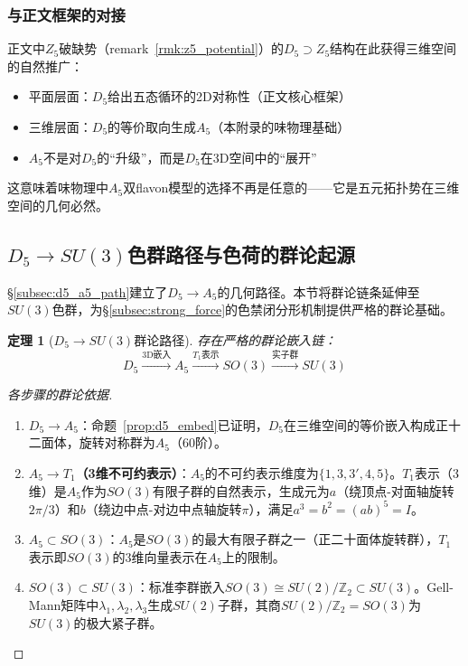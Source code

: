 \documentclass[12pt,a4paper,twocolumn]{article}
\newtheorem{theorem}{定理}[section]
\begin{document}
\subsubsection{与正文框架的对接}

正文中$Z_5$破缺势（remark~\ref{rmk:z5_potential}）的$D_5 \supset Z_5$结构在此获得三维空间的自然推广：

\begin{itemize}
\item 平面层面：$D_5$给出五态循环的2D对称性（正文核心框架）
\item 三维层面：$D_5$的等价取向生成$A_5$（本附录的味物理基础）
\item $A_5$不是对$D_5$的``升级''，而是$D_5$在3D空间中的``展开''
\end{itemize}

这意味着味物理中$A_5$双flavon模型的选择不再是任意的——它是五元拓扑势在三维空间的几何必然。

\subsection{$D_5 \to SU(3)$色群路径与色荷的群论起源}
\label{subsec:d5_su3}

§\ref{subsec:d5_a5_path}建立了$D_5 \to A_5$的几何路径。本节将群论链条延伸至$SU(3)$色群，为§\ref{subsec:strong_force}的色禁闭分形机制提供严格的群论基础。

\begin{theorem}[$D_5 \to SU(3)$群论路径]
\label{thm:d5_su3}
存在严格的群论嵌入链：
\begin{equation}
D_5 \xrightarrow{\text{3D嵌入}} A_5 \xrightarrow{T_1\text{表示}} SO(3) \xrightarrow{\text{实子群}} SU(3)
\end{equation}
\end{theorem}

\begin{proof}[各步骤的群论依据]
\begin{enumerate}
\item \textbf{$D_5 \to A_5$}：命题~\ref{prop:d5_embed}已证明，$D_5$在三维空间的等价嵌入构成正十二面体，旋转对称群为$A_5$（60阶）。
\item \textbf{$A_5 \to T_1$（3维不可约表示）}：$A_5$的不可约表示维度为$\{1, 3, 3', 4, 5\}$。$T_1$表示（3维）是$A_5$作为$SO(3)$有限子群的自然表示，生成元为$a$（绕顶点-对面轴旋转$2\pi/3$）和$b$（绕边中点-对边中点轴旋转$\pi$），满足$a^3 = b^2 = (ab)^5 = I$。
\item \textbf{$A_5 \subset SO(3)$}：$A_5$是$SO(3)$的最大有限子群之一（正二十面体旋转群），$T_1$表示即$SO(3)$的3维向量表示在$A_5$上的限制。
\item \textbf{$SO(3) \subset SU(3)$}：标准李群嵌入$SO(3) \cong SU(2)/\mathbb{Z}_2 \subset SU(3)$。Gell-Mann矩阵中$\lambda_1, \lambda_2, \lambda_3$生成$SU(2)$子群，其商$SU(2)/\mathbb{Z}_2 = SO(3)$为$SU(3)$的极大紧子群。
\end{enumerate}
\end{proof}
\end{document}
